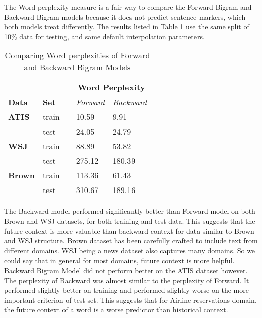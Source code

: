 \documentclass{article}
\begin{document}
The Word perplexity measure is a fair way to compare the Forward Bigram and Backward Bigram models because it does not predict sentence markers, which both models treat  differently. The results listed in Table \ref{backvforw} use the same split of 10\% data for testing, and same default interpolation parameters.
\begin{table}[h]
\centering
\begin{tabular}{@{}lllll@{}}
\toprule
\textbf{}      & \textbf{}    &  & \multicolumn{2}{c}{\textbf{Word Perplexity}} \\ \midrule
\textbf{Data}  & \textbf{Set} &  & \textit{Forward}     & \textit{Backward}     \\ \midrule
\textbf{ATIS}  & train        &  & 10.59               & 9.91               \\ \midrule
               & test         &  & 24.05               & 24.79                \\ \midrule
\textbf{WSJ}   & train        &  & 88.89               & 53.82                \\ \midrule
               & test         &  & 275.12               & 180.39               \\ \midrule
\textbf{Brown} & train        &  & 113.36              & 61.43                \\ \midrule
               & test         &  & 310.67              & 189.16               \\ \bottomrule
\end{tabular}
\caption{Comparing Word perplexities of Forward and Backward Bigram Models}
\label{backvforw}
\end{table}
The Backward model performed significantly better than Forward model on both Brown and WSJ datasets, for both training and test data. This suggests that the future context is more valuable than backward context for data similar to Brown and WSJ structure. Brown dataset has been carefully crafted to include text from different domains. WSJ being a news dataset also captures many domains. So we could say that in general for most domains, future context is more helpful. Backward Bigram Model did not perform better on the ATIS dataset however. The perplexity of Backward was almost similar to the perplexity of Forward. It performed slightly better on training and performed slightly worse on the more important criterion of test set. This suggests that for Airline reservations domain, the future context of a word is a worse predictor than historical context.
\end{document}
